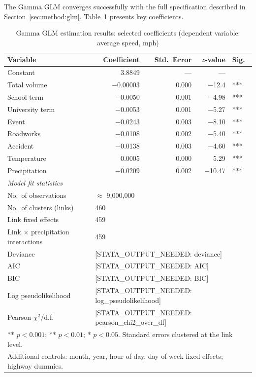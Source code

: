 \documentclass[review]{elsarticle}
\begin{document}
The Gamma GLM converges successfully with the full specification described in Section~\ref{sec:method:glm}. Table~\ref{tab:glm} presents key coefficients.

\begin{table}[htbp]
\centering
\caption{Gamma GLM estimation results: selected coefficients (dependent variable: average speed, mph)}
\label{tab:glm}
\begin{tabular}{lrrrl}
\toprule
Variable & Coefficient & Std.\ Error & $z$-value & Sig. \\
\midrule
Constant & 3.8849 & --- & --- & \\
Total volume & $-$0.00003 & 0.000 & $-$12.4 & *** \\
School term & $-$0.0050 & 0.001 & $-$4.98 & *** \\
University term & $-$0.0053 & 0.001 & $-$5.27 & *** \\
Event & $-$0.0243 & 0.003 & $-$8.10 & *** \\
Roadworks & $-$0.0108 & 0.002 & $-$5.40 & *** \\
Accident & $-$0.0138 & 0.003 & $-$4.60 & *** \\
Temperature & 0.0005 & 0.000 & 5.29 & *** \\
Precipitation & $-$0.0209 & 0.002 & $-$10.47 & *** \\
\midrule
\multicolumn{5}{l}{\textit{Model fit statistics}} \\
No.\ of observations & \multicolumn{4}{l}{$\approx$ 9{,}000{,}000} \\
No.\ of clusters (links) & \multicolumn{4}{l}{460} \\
Link fixed effects & \multicolumn{4}{l}{459} \\
Link $\times$ precipitation interactions & \multicolumn{4}{l}{459} \\
Deviance & \multicolumn{4}{l}{[STATA\_OUTPUT\_NEEDED: deviance]} \\
AIC & \multicolumn{4}{l}{[STATA\_OUTPUT\_NEEDED: AIC]} \\
BIC & \multicolumn{4}{l}{[STATA\_OUTPUT\_NEEDED: BIC]} \\
Log pseudolikelihood & \multicolumn{4}{l}{[STATA\_OUTPUT\_NEEDED: log\_pseudolikelihood]} \\
Pearson $\chi^2$/d.f. & \multicolumn{4}{l}{[STATA\_OUTPUT\_NEEDED: pearson\_chi2\_over\_df]} \\
\bottomrule
\multicolumn{5}{l}{\footnotesize *** $p < 0.001$; ** $p < 0.01$; * $p < 0.05$. Standard errors clustered at the link level.} \\
\multicolumn{5}{l}{\footnotesize Additional controls: month, year, hour-of-day, day-of-week fixed effects; highway dummies.} \\
\end{tabular}
\end{table}
\end{document}
